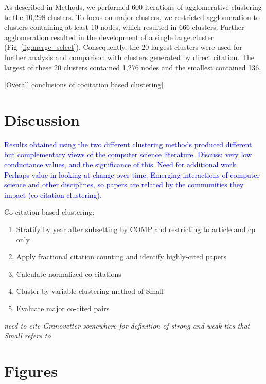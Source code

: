 As described in Methods, we performed 600 iterations of agglomerative clustering to the 10,298 clusters. To focus on major clusters, we restricted agglomeration to clusters containing at least 10 nodes, which resulted in 666 clusters. Further agglomeration resulted in the development of a single large cluster (Fig~\ref{fig:merge_select}).  Consequently, the 20 largest clusters were used for further analysis and comparison with clusters generated by direct citation. The largest of these 20 clusters contained 1,276 nodes and the smallest contained 136.

[Overall conclusions of cocitation based clustering]

\section{Discussion}
\textcolor{blue}{
Results obtained using the two different clustering methods produced different but complementary views of the computer
science literature.
Discuss: very low conductance values, and the significance of this. 
Need for additional work. 
Perhaps value in looking at change over time.
Emerging interactions of computer science and other disciplines, 
so papers are related by the communities they impact (co-citation clustering).
 }

Co-citation based clustering:
\begin{enumerate}
\item Stratify by year after subsetting by COMP and restricting to article and cp only
\item Apply fractional citation counting and identify highly-cited papers
\item Calculate normalized co-citations
\item Cluster by variable clustering method of Small
\item Evaluate major co-cited pairs
\end{enumerate}

\emph{need to cite Granovetter somewhere for definition of strong and weak ties that Small refers to}
\clearpage

\section*{Figures}

